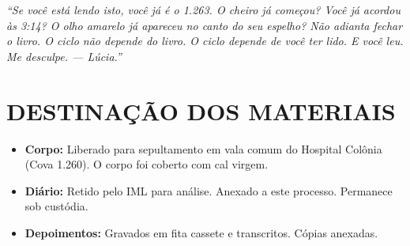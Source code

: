 \noindent\textit{``Se você está lendo isto, você já é o 1.263. O cheiro já começou? Você já acordou às 3:14? O olho amarelo já apareceu no canto do seu espelho? Não adianta fechar o livro. O ciclo não depende do livro. O ciclo depende de você ter lido. E você leu. Me desculpe. --- Lúcia.''
}

\vspace{2em}

\begin{center}
\end{center}

\vspace{2em}

\section*{DESTINAÇÃO DOS MATERIAIS}

\begin{itemize}
    \item \textbf{Corpo:} Liberado para sepultamento em vala comum do Hospital Colônia (Cova 1.260). O corpo foi coberto com cal virgem.
    \item \textbf{Diário:} Retido pelo IML para análise. Anexado a este processo. Permanece sob custódia.
    \item \textbf{Depoimentos:} Gravados em fita cassete e transcritos. Cópias anexadas.
\end{itemize}

